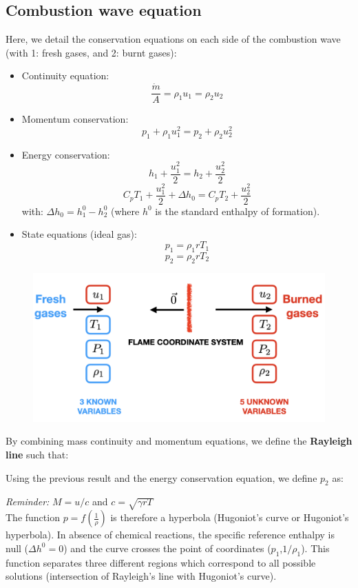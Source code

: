 \documentclass[a4paper,11pt]{article}
\begin{document}
\subsection{Combustion wave equation}
Here, we detail the conservation equations on each side of the combustion wave (with 1: fresh gases, and 2: burnt gases):\\
\begin{itemize}
	\item Continuity equation:
	\[\frac{\dot{m}}{A}=\rho_1 u_1=\rho_2 u_2\]
	\item Momentum conservation:
	\[p_1 + \rho_1 u_1^2 = p_2 + \rho_2 u_2^2 \]
	\item Energy conservation:
	\[   	h_1 + \frac{u_1^2}{2} =  h_2 + \frac{u_2^2}{2} \]
	\[   	C_pT_1 + \frac{u_1^2}{2} + \Delta h_0=  C_pT_2 + \frac{u_2^2}{2} \]
	with: $\Delta h_0 = h_1^0 - h_2^0$ (where $h^0$ is the standard enthalpy of formation).
	\item State equations (ideal gas):
	\[p_1 =  \rho_1 r T_1  \]
	\[p_2 =  \rho_2 r T_2  \]
\end{itemize}
\begin{figure}[h]
	\centering
	\includegraphics[width=.8\linewidth]{figures/planarwave.png}
\end{figure}
By combining mass continuity and momentum equations, we define the \textbf{Rayleigh line} such that:
\begin{center}
\end{center}
Using the previous result and the energy conservation equation, we define $p_2$ as:
\begin{center}
\end{center}
\textit{Reminder:} $M = u/c$ and $c=\sqrt{\gamma r T}$\\
The function $p=f(\frac{1}{\rho})$ is therefore a hyperbola (Hugoniot's curve or Hugoniot's hyperbola). In absence of chemical reactions, the specific reference enthalpy is null ($\Delta h^0 = 0$) and the curve crosses the point of coordinates ($p_1$,$1/\rho_1$). This function separates three different regions which correspond to all possible solutions (intersection of Rayleigh's line with Hugoniot's curve).
\end{document}
